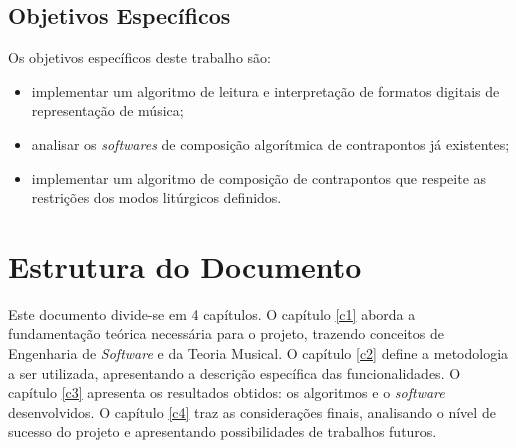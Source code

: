       \subsection*{Objetivos Específicos}

        Os objetivos específicos deste trabalho são:

        \begin{itemize}
          \item implementar um algoritmo de leitura e interpretação de formatos digitais de representação de música;
          \item analisar os \textit{softwares} de composição algorítmica de contrapontos já existentes;
          \item implementar um algoritmo de composição de contrapontos que respeite as restrições dos modos litúrgicos definidos.
        \end{itemize}

  \section*{Estrutura do Documento}

    Este documento divide-se em 4 capítulos. O capítulo \ref{c1} aborda a fundamentação teórica necessária para o projeto, trazendo conceitos de Engenharia de \textit{Software} e da Teoria Musical. O capítulo \ref{c2} define a metodologia a ser utilizada, apresentando a descrição específica das funcionalidades. O capítulo \ref{c3} apresenta os resultados obtidos: os algoritmos e o \textit{software} desenvolvidos. O capítulo \ref{c4} traz as considerações finais, analisando o nível de sucesso do projeto e apresentando possibilidades de trabalhos futuros.
